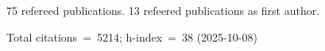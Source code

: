 75 refereed publications. 13 refeered publications as first author.

Total citations~=~5214; h-index~=~38 (2025-10-08)